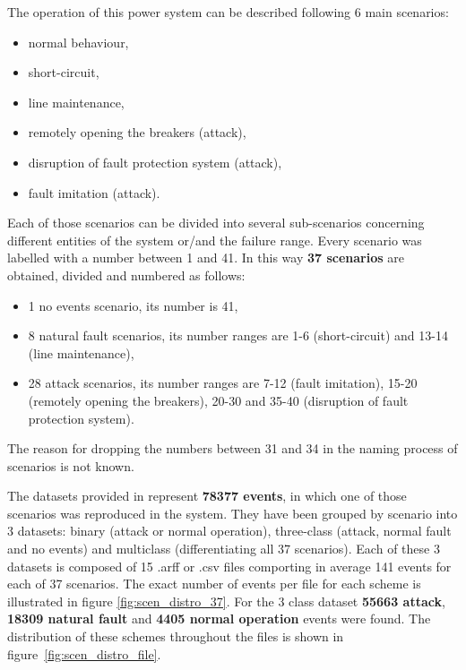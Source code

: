 The operation of this power system can be described following 6 main scenarios:
\begin{itemize}
    \item normal behaviour, 
    \item short-circuit,
    \item line maintenance,
    \item remotely opening the breakers (attack),
    \item disruption of fault protection system (attack),
    \item fault imitation (attack).
\end{itemize} 
Each of those scenarios can be divided into several sub-scenarios concerning different entities of the system or/and the failure range. Every scenario was labelled with a number between 1 and 41. In this way \textbf{37 scenarios} are obtained, divided and numbered as follows:
\begin{itemize}
    \item 1 no events scenario, its number is 41,
    \item 8 natural fault scenarios, its number ranges are 1-6 (short-circuit) and 13-14 (line maintenance),
    \item 28 attack scenarios, its number ranges are 7-12 (fault imitation), 15-20 (remotely opening the breakers), 20-30 and 35-40 (disruption of fault protection system).
\end{itemize}
The reason for dropping the numbers between 31 and 34 in the naming process of scenarios is not known.

The datasets provided in \cite{morris_industrial_nodate} represent \textbf{78377 events}, in which one of those scenarios was reproduced in the system. They have been grouped by scenario into 3 datasets: binary (attack or normal operation), three-class (attack, normal fault and no events) and multiclass (differentiating all 37 scenarios). Each of these 3 datasets is composed of 15 .arff or .csv files comporting in average 141 events for each of 37 scenarios. The exact number of events per file for each scheme is illustrated in figure \ref{fig:scen_distro_37}. For the 3 class dataset \textbf{55663 attack}, \textbf{18309 natural fault} and \textbf{4405 normal operation} events were found. The distribution of these schemes throughout the files is shown in figure~\ref{fig:scen_distro_file}. 

